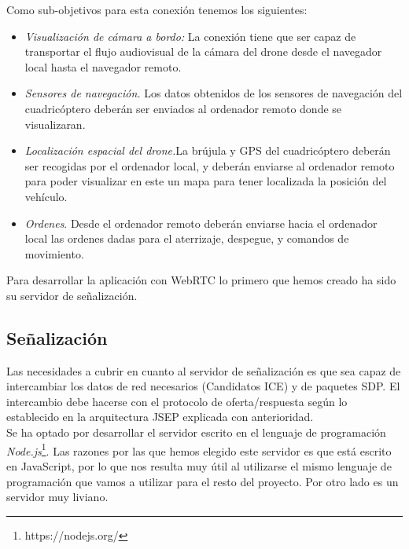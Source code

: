 Como sub-objetivos para esta conexión tenemos los siguientes:

\begin{itemize}

\item \emph{Visualización de cámara a bordo:} La conexión tiene que ser capaz de transportar el flujo audiovisual de la cámara del drone desde el navegador local hasta el navegador remoto.

\item \emph{Sensores de navegación.} Los datos obtenidos de los sensores de navegación del cuadricóptero deberán ser enviados al ordenador remoto donde se visualizaran.

\item \emph{Localización espacial del drone.}La brújula y GPS del cuadricóptero deberán ser recogidas por el ordenador local, y deberán enviarse al ordenador remoto para poder visualizar en este un mapa para tener localizada la posición del vehículo.

\item \emph{Ordenes}. Desde el ordenador remoto deberán enviarse hacia el ordenador local las ordenes dadas para el aterrizaje, despegue, y comandos de movimiento.

\end{itemize}

Para desarrollar la aplicación con WebRTC lo primero que hemos creado ha sido su servidor de señalización.\\

\subsection{Señalización}

Las necesidades a cubrir en cuanto al servidor de señalización es que sea capaz de intercambiar los datos de red necesarios (Candidatos ICE) y de paquetes SDP. El intercambio debe hacerse con el protocolo de oferta/respuesta según lo establecido en la arquitectura JSEP explicada con anterioridad.\\

Se ha optado por desarrollar el servidor escrito en el lenguaje de programación \emph{Node.js}\footnote{https://nodejs.org/}. Las razones por las que hemos elegido este servidor es que está escrito en JavaScript, por lo que nos resulta muy útil al utilizarse el mismo lenguaje de programación que vamos a utilizar para el resto del proyecto. Por otro lado es un servidor muy liviano.\\


